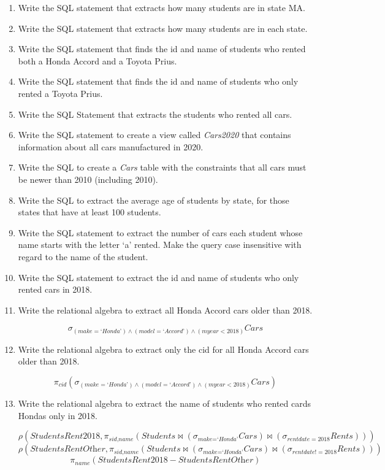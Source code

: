 \documentclass[letterpaper, 11pt]{article}
\begin{document}
\begin{enumerate}[leftmargin=*]
    \item Write the SQL statement that extracts how many students are in state MA.
    \item Write the SQL statement that extracts how many students are in each state.
    \item Write the SQL statement that finds the id and name of students who rented both a Honda Accord and a Toyota Prius. 
    \item Write the SQL statement that finds the id and name of students who only rented a Toyota Prius.
    \item Write the SQL Statement that extracts the students who rented all cars.
    \item Write the SQL statement to create a view called \textit{Cars2020} that contains information about all cars manufactured in 2020.
    \item Write the SQL to create a \textit{Cars} table with the constraints that all cars must be newer than 2010 (including 2010).
    \item Write the SQL to extract the average age of students by state, for those states that have at least 100 students.
    \item Write the SQL statement to extract the number of cars each student whose name starts with the letter `a’  rented. Make the query case insensitive with regard to the name of the student.
    \item Write the SQL statement to extract the id and name of students who only rented cars in 2018.
    \item Write the relational algebra to extract all Honda Accord cars older than 2018.
    \begin{tcolorbox}[oversize]
    \[\sigma_{(\textit{make}=\textit{`Honda'}) \wedge (\textit{model}=\textit{`Accord'}) \wedge (\textit{myear} < 2018)}\textit{Cars}\]
    \end{tcolorbox}
    \item Write the relational algebra to extract only the cid for all Honda Accord cars older than 2018.
    \begin{tcolorbox}[oversize]
    \[\pi_{\textit{cid}}(\sigma_{(\textit{make}=\textit{`Honda'}) \wedge (\textit{model}=\textit{`Accord'}) \wedge (\textit{myear} < 2018)}\textit{Cars})\]
    \end{tcolorbox}
    \item Write the relational algebra to extract the name of students who rented cards Hondas only in 2018.
    \begin{tcolorbox}[oversize]
    \[\rho(\textit{StudentsRent2018}, \pi_{\textit{sid,name}}(\textit{Students} \bowtie (\sigma_{\textit{make}=\textit{`Honda'}}\textit{Cars}) \bowtie (\sigma_{\textit{rentdate}=2018}\textit{Rents})))\]
    \[\rho(\textit{StudentsRentOther}, \pi_{\textit{sid,name}}(\textit{Students} \bowtie (\sigma_{\textit{make}=\textit{`Honda'}}\textit{Cars}) \bowtie (\sigma_{\textit{rentdate}!=2018}\textit{Rents})))\]
    \[\pi_{\textit{name}}(\textit{StudentsRent2018} - \textit{StudentsRentOther})\]
    \end{tcolorbox}
\end{enumerate}
\end{document}

